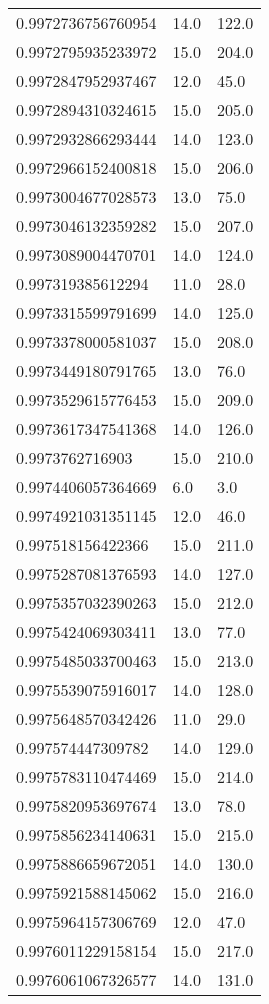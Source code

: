 \begin{center}
\begin{supertabular}[H]{p{0.30\textwidth}p{0.05\textwidth}p{0.05\textwidth}}
0.9972736756760954 & 14.0 & 122.0 \\ 
0.9972795935233972 & 15.0 & 204.0 \\ 
0.9972847952937467 & 12.0 & 45.0 \\ 
0.9972894310324615 & 15.0 & 205.0 \\ 
0.9972932866293444 & 14.0 & 123.0 \\ 
0.9972966152400818 & 15.0 & 206.0 \\ 
0.9973004677028573 & 13.0 & 75.0 \\ 
0.9973046132359282 & 15.0 & 207.0 \\ 
0.9973089004470701 & 14.0 & 124.0 \\ 
0.997319385612294 & 11.0 & 28.0 \\ 
0.9973315599791699 & 14.0 & 125.0 \\ 
0.9973378000581037 & 15.0 & 208.0 \\ 
0.9973449180791765 & 13.0 & 76.0 \\ 
0.9973529615776453 & 15.0 & 209.0 \\ 
0.9973617347541368 & 14.0 & 126.0 \\ 
0.9973762716903 & 15.0 & 210.0 \\ 
0.9974406057364669 & 6.0 & 3.0 \\ 
0.9974921031351145 & 12.0 & 46.0 \\ 
0.997518156422366 & 15.0 & 211.0 \\ 
0.9975287081376593 & 14.0 & 127.0 \\ 
0.9975357032390263 & 15.0 & 212.0 \\ 
0.9975424069303411 & 13.0 & 77.0 \\ 
0.9975485033700463 & 15.0 & 213.0 \\ 
0.9975539075916017 & 14.0 & 128.0 \\ 
0.9975648570342426 & 11.0 & 29.0 \\ 
0.997574447309782 & 14.0 & 129.0 \\ 
0.9975783110474469 & 15.0 & 214.0 \\ 
0.9975820953697674 & 13.0 & 78.0 \\ 
0.9975856234140631 & 15.0 & 215.0 \\ 
0.9975886659672051 & 14.0 & 130.0 \\ 
0.9975921588145062 & 15.0 & 216.0 \\ 
0.9975964157306769 & 12.0 & 47.0 \\ 
0.9976011229158154 & 15.0 & 217.0 \\ 
0.9976061067326577 & 14.0 & 131.0 \\ 

\end{supertabular}
\end{center}
